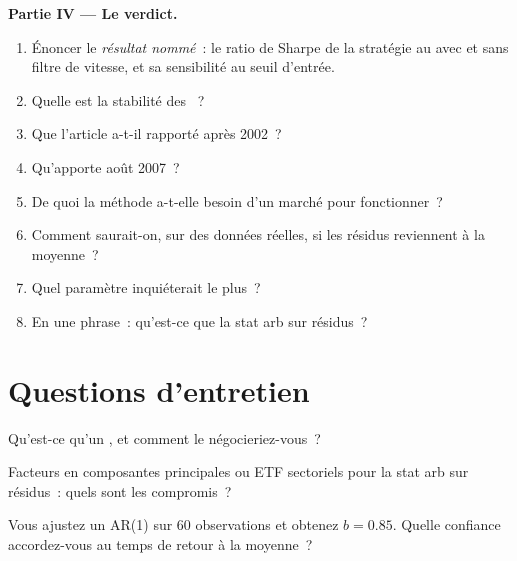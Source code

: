 \begin{problem}
\medskip\noindent\textbf{Partie IV --- Le verdict.}
\begin{enumerate}[resume]
\item Énoncer le \emph{résultat nommé}~: le ratio de Sharpe de la stratégie au  avec et sans filtre de vitesse, et sa sensibilité au seuil d'entrée.
\item Quelle est la stabilité des ~?
\item Que l'article a-t-il rapporté après 2002~?
\item Qu'apporte août 2007~?
\item De quoi la méthode a-t-elle besoin d'un marché pour fonctionner~?
\item Comment saurait-on, sur des données réelles, si les résidus reviennent à la moyenne~?
\item Quel paramètre inquiéterait le plus~?
\item En une phrase~: qu'est-ce que la stat arb sur résidus~?
\end{enumerate}
\end{problem}

\section{Questions d'entretien}

\begin{interviewq}\label{iq:s1:residual-and-principal-component-stat-arb:1}
Qu'est-ce qu'un , et comment le négocieriez-vous~?
\end{interviewq}

\begin{interviewq}\label{iq:s1:residual-and-principal-component-stat-arb:2}
Facteurs en composantes principales ou ETF sectoriels pour la stat arb sur résidus~: quels sont les compromis~?
\end{interviewq}

\begin{interviewq}\label{iq:s1:residual-and-principal-component-stat-arb:3}
Vous ajustez un AR(1) sur 60 observations et obtenez $b = 0.85$. Quelle confiance accordez-vous au temps de retour à la moyenne~?
\end{interviewq}

